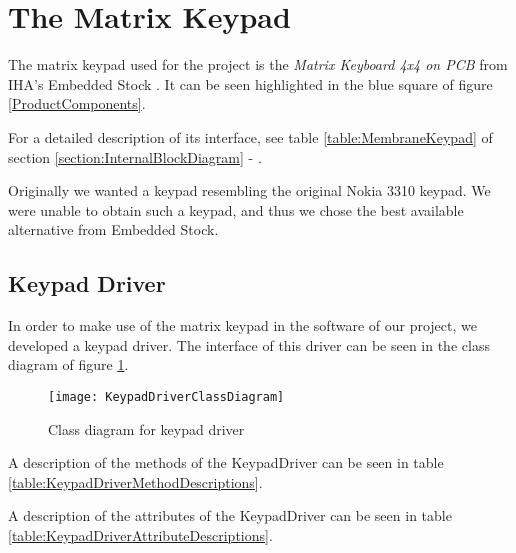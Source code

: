 \section{The Matrix Keypad}
\label{section:MatrixKeyboard}

The matrix keypad used for the project is the \textit{Matrix Keyboard 4x4 on PCB} from IHA's Embedded Stock \cite{MatrixKeyboard}. It can be seen highlighted in the blue square of figure \ref{ProductComponents}.

For a detailed description of its interface, see table \ref{table:MembraneKeypad} of section \ref{section:InternalBlockDiagram} - .

Originally we wanted a keypad resembling the original Nokia 3310 keypad. We were unable to obtain such a keypad, and thus we chose the best available alternative from Embedded Stock.

\subsection{Keypad Driver}
In order to make use of the matrix keypad in the software of our project, we developed a keypad driver. The interface of this driver can be seen in the class diagram of figure \ref{KeypadDriverClassDiagram}.

\begin{figure}[H]
	\texttt{[image: KeypadDriverClassDiagram]}
	\centering
	\caption{Class diagram for keypad driver}
	\label{KeypadDriverClassDiagram}
\end{figure}

A description of the methods of the KeypadDriver can be seen in table \ref{table:KeypadDriverMethodDescriptions}.

A description of the attributes of the KeypadDriver can be seen in table \ref{table:KeypadDriverAttributeDescriptions}.

